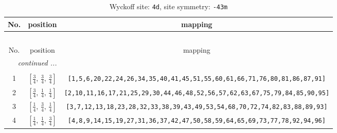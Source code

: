 \documentclass[fleqn,8pt]{jsarticle}
\begin{document}
\renewcommand{\arraystretch}{1.2}
\begin{longtable}{ccc}
\caption{Wyckoff site: {\tt 4d}, site symmetry: {\tt -43m}}
 \\
 \hline \hline
No. & position & mapping \\ \hline \endfirsthead

\multicolumn{2}{l}{\tablename\ \thetable{}} \\
 \hline \hline
No. & position & mapping \\ \hline \endhead

 \hline \hline
\multicolumn{2}{r}{\footnotesize\it continued ...} \\ \endfoot

 \hline \hline
\multicolumn{2}{r}{} \\ \endlastfoot

1 & $\left[ \frac{3}{4},\, \frac{3}{4},\, \frac{3}{4} \right]$ & {\tt [1,5,6,20,22,24,26,34,35,40,41,45,51,55,60,61,66,71,76,80,81,86,87,91]} \\ \hline
2 & $\left[ \frac{3}{4},\, \frac{1}{4},\, \frac{1}{4} \right]$ & {\tt [2,10,11,16,17,21,25,29,30,44,46,48,52,56,57,62,63,67,75,79,84,85,90,95]} \\ \hline
3 & $\left[ \frac{1}{4},\, \frac{3}{4},\, \frac{1}{4} \right]$ & {\tt [3,7,12,13,18,23,28,32,33,38,39,43,49,53,54,68,70,72,74,82,83,88,89,93]} \\ \hline
4 & $\left[ \frac{1}{4},\, \frac{1}{4},\, \frac{3}{4} \right]$ & {\tt [4,8,9,14,15,19,27,31,36,37,42,47,50,58,59,64,65,69,73,77,78,92,94,96]} \\
\end{longtable}
\renewcommand{\arraystretch}{1.2}
\end{document}
